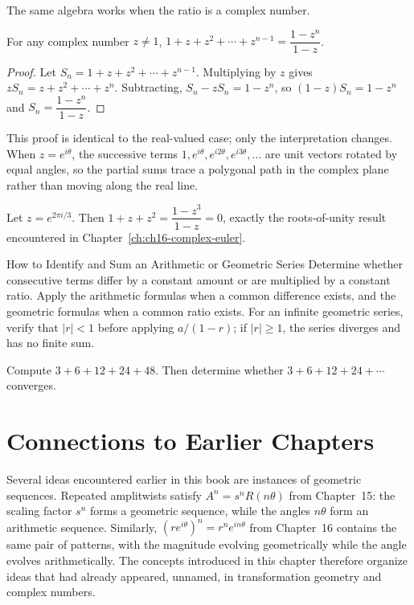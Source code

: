 The same algebra works when the ratio is a complex number.

\begin{theorem}
For any complex number $z \neq 1$, $1+z+z^2+\cdots+z^{n-1} =
\dfrac{1-z^n}{1-z}$.
\end{theorem}

\begin{proof}
Let $S_n = 1+z+z^2+\cdots+z^{n-1}$. Multiplying by $z$ gives $zS_n =
z+z^2+\cdots+z^n$. Subtracting, $S_n - zS_n = 1-z^n$, so $(1-z)S_n =
1-z^n$ and $S_n = \dfrac{1-z^n}{1-z}$.
\end{proof}

This proof is identical to the real-valued case; only the interpretation
changes. When $z = e^{i\theta}$, the successive terms $1, e^{i\theta},
e^{i2\theta}, e^{i3\theta}, \dots$ are unit vectors rotated by equal
angles, so the partial sums trace a polygonal path in the complex plane
rather than moving along the real line.

\begin{example}
Let $z = e^{2\pi i/3}$. Then $1+z+z^2 = \dfrac{1-z^3}{1-z} = 0$, exactly
the roots-of-unity result encountered in Chapter~\ref{ch:ch16-complex-euler}.
\end{example}

\begin{algorithmproc}{How to Identify and Sum an Arithmetic or Geometric Series}
Determine whether consecutive terms differ by a constant amount or are
multiplied by a constant ratio. Apply the arithmetic formulas when a
common difference exists, and the geometric formulas when a common ratio
exists. For an infinite geometric series, verify that $|r|<1$ before
applying $a/(1-r)$; if $|r|\ge1$, the series diverges and has no finite
sum.
\end{algorithmproc}

\begin{practicenow}
Compute $3+6+12+24+48$. Then determine whether $3+6+12+24+\cdots$
converges.
\end{practicenow}

\section{Connections to Earlier Chapters}

Several ideas encountered earlier in this book are instances of
geometric sequences. Repeated amplitwists satisfy $A^n = s^nR(n\theta)$
from Chapter~15: the scaling factor $s^n$ forms a geometric sequence,
while the angles $n\theta$ form an arithmetic sequence. Similarly,
$(re^{i\theta})^n = r^ne^{in\theta}$ from Chapter~16 contains the same
pair of patterns, with the magnitude evolving geometrically while the
angle evolves arithmetically. The concepts introduced in this chapter
therefore organize ideas that had already appeared, unnamed, in
transformation geometry and complex numbers.

